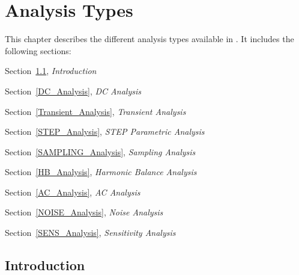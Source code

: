 


\chapter{Analysis Types}
\label{Analysis_Chap}

{
This chapter describes the different analysis types
available in \Xyce{}.  It includes the following sections:
\begin{XyceItemize}
\item Section~\ref{analysis_intro},     {\em Introduction}
\item Section~\ref{DC_Analysis},        {\em DC Analysis}
\item Section~\ref{Transient_Analysis}, {\em Transient Analysis}
\item Section~\ref{STEP_Analysis},      {\em STEP Parametric Analysis}
\item Section~\ref{SAMPLING_Analysis},  {\em Sampling Analysis}
\item Section~\ref{HB_Analysis},        {\em Harmonic Balance Analysis}
\item Section~\ref{AC_Analysis},        {\em AC Analysis}
\item Section~\ref{NOISE_Analysis},     {\em Noise Analysis}
\item Section~\ref{SENS_Analysis},      {\em Sensitivity Analysis}
\end{XyceItemize}
}

\section{Introduction}
\label{analysis_intro}

